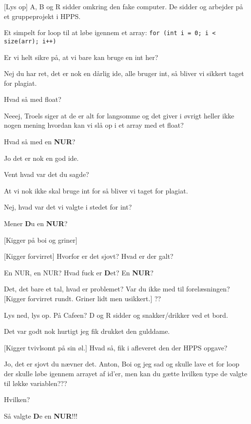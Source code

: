 \documentclass{article}
\begin{document}
\newpage%
\begin{sketch}
\scene{}
[Lys op] A, B og R sidder omkring den fake computer. De sidder og arbejder på et gruppeprojekt i HPPS.

 Et simpelt for loop til at løbe igennem et array: \verb|for (int i = 0; i < size(arr); i++)|

Er vi helt sikre på, at vi bare kan bruge en int her?

Nej du har ret, det er nok en dårlig ide, alle bruger int, så bliver vi sikkert taget for plagiat.


 Hvad så med float?

Neeej, Troels siger at de er alt for langsomme og det giver i øvrigt heller ikke nogen mening hvordan kan vi slå op i et array med et float?

Hvad så med en \textbf{NUR}?

Jo det er nok en god ide.

Vent hvad var det du sagde?

At vi nok ikke skal bruge int for så bliver vi taget for plagiat.

Nej, hvad var det vi valgte i stedet for int?

Mener \textbf{D}u en \textbf{NUR}?

[Kigger på boi og griner]

[Kigger forvirret]
Hvorfor er det sjovt? Hvad er der galt?

En NUR, en NUR? Hvad fuck er \textbf{D}et? En \textbf{NUR}?

Det, det bare et tal, hvad er problemet?
Var du ikke med til forelæsningen?
[Kigger forvirret rundt. Griner lidt men usikkert.] ??


\scene{}
Lys ned, lys op.
På Cafeen?
D og R sidder og snakker/drikker ved et bord.

Det var godt nok hurtigt jeg fik drukket den gulddame.

[Kigger tvivlsomt på sin øl.] Hvad så, fik i afleveret den der HPPS opgave?

Jo, det er sjovt du nævner det. Anton, Boi og jeg sad og skulle lave et for loop der skulle løbe igennem arrayet af id’er, men kan du gætte hvilken type de valgte til løkke variablen???

Hvilken?

Så valgte \textbf{D}e en \textbf{NUR}!!!


\end{sketch}
\end{document}
